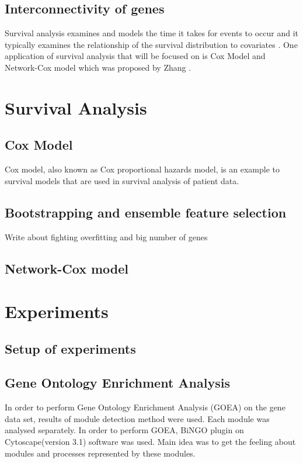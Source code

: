 \documentclass{ba-kecs}
\numberwithin{figure}{section}
\numberwithin{equation}{section}
\begin{document}
\subsection{Interconnectivity of genes}

Survival analysis examines and models the time it takes for events to occur and it typically examines the relationship of the survival distribution to covariates \cite{cox}. One application of survival analysis that will be focused on is Cox Model and Network-Cox model which was proposed by Zhang \cite{netcox}.

\section{Survival Analysis}
\subsection{Cox Model}
Cox model, also known as Cox proportional hazards model, is an example to survival models that are used in survival analysis of patient data. 

\subsection{Bootstrapping and ensemble feature selection}
Write about fighting overfitting and big number of genes
\subsection{Network-Cox model}


\section{Experiments}
\subsection{Setup of experiments}
\subsection{Gene Ontology Enrichment Analysis}
In order to perform Gene Ontology Enrichment Analysis (GOEA) on the gene data set, results of module detection method were used. Each module was analysed separately. In order to perform GOEA, BiNGO plugin on Cytoscape(version 3.1) software was used. Main idea was to get the feeling about modules and processes represented by these modules.
\end{document}
